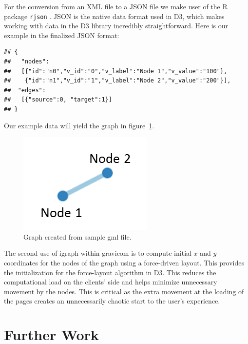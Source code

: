 \documentclass{article}\usepackage[]{graphicx}\usepackage[]{color}
\makeatletter
\newenvironment{kframe}{%
 \def\at@end@of@kframe{}%
 \ifinner\ifhmode%
  \def\at@end@of@kframe{\end{minipage}}%
  \begin{minipage}{\columnwidth}%
 \fi\fi%
 \def\FrameCommand##1{\hskip\@totalleftmargin \hskip-\fboxsep
 \colorbox{shadecolor}{##1}\hskip-\fboxsep
     \hskip-\linewidth \hskip-\@totalleftmargin \hskip\columnwidth}%
 \MakeFramed {\advance\hsize-\width
   \@totalleftmargin\z@ \linewidth\hsize
   \@setminipage}}%
 {\par\unskip\endMakeFramed%
 \at@end@of@kframe}
\newenvironment{knitrout}{}{} %
\makeatother
\begin{document}
For the conversion from an  XML file  to a JSON file we make user of the R package {\tt rjson} \cite{acb-rjson}.  JSON is the native data format used in D3, which  makes working with data in the D3 library incredibly straightforward. Here is our example in the finalized JSON format:
\begin{knitrout}
\color{fgcolor}\begin{kframe}
\begin{verbatim}
## {
##   "nodes":
##   [{"id":"n0","v_id":"0","v_label":"Node 1","v_value":"100"}, 
##    {"id":"n1","v_id":"1","v_label":"Node 2","v_value":"200"}], 
##  "edges":
##   [{"source":0, "target":1}]
## }
\end{verbatim}
\end{kframe}
\end{knitrout}

Our example data will yield the graph in figure~\ref{fig:samplegraph}.

\begin{figure}[H]
\centering
\includegraphics{images/samplegraph.png}
\caption{\label{fig:samplegraph} Graph created from sample gml file.}
\end{figure}
The second use of igraph within gravicom is to compute initial $x$ and $y$ coordinates for the nodes of the graph using a force-driven layout. This provides the initialization for the force-layout algorithm in D3. This reduces the computational load on the clients' side and helps minimize unnecessary movement by the nodes. This is critical as the extra movement at the loading of the pages creates an unnecessarily chaotic start to the user's experience. 




\section{Further Work}

\printbibliography
\end{document}
